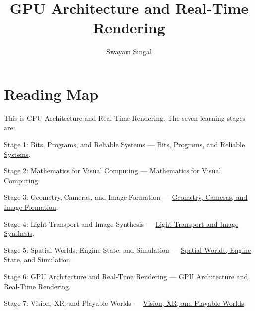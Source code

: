 \documentclass[11pt,twoside,openany]{book}
\title{GPU Architecture and Real-Time Rendering}
\author{Swayam Singal}
\begin{document}
\maketitle
\begin{center}\end{center}
\chapter*{Reading Map}
\hypertarget{volume-reading-map}{}
\noindent This is GPU Architecture and Real-Time Rendering. The seven learning stages are:
\par\noindent Stage 1: Bits, Programs, and Reliable Systems --- \href{../01-Bits-Programs-and-Reliable-Systems/main.pdf}{Bits, Programs, and Reliable Systems}.
\par\noindent Stage 2: Mathematics for Visual Computing --- \href{../02-Mathematics-for-Visual-Computing/main.pdf}{Mathematics for Visual Computing}.
\par\noindent Stage 3: Geometry, Cameras, and Image Formation --- \href{../03-Geometry-Cameras-and-Image-Formation/main.pdf}{Geometry, Cameras, and Image Formation}.
\par\noindent Stage 4: Light Transport and Image Synthesis --- \href{../04-Light-Transport-and-Image-Synthesis/main.pdf}{Light Transport and Image Synthesis}.
\par\noindent Stage 5: Spatial Worlds, Engine State, and Simulation --- \href{../05-Spatial-Worlds-Engine-State-and-Simulation/main.pdf}{Spatial Worlds, Engine State, and Simulation}.
\par\noindent Stage 6: GPU Architecture and Real-Time Rendering --- \href{../06-GPU-Architecture-and-Real-Time-Rendering/main.pdf}{GPU Architecture and Real-Time Rendering}.
\par\noindent Stage 7: Vision, XR, and Playable Worlds --- \href{../07-Vision-XR-and-Playable-Worlds/main.pdf}{Vision, XR, and Playable Worlds}.
\tableofcontents
\mainmatter
\setcounter{chapter}{0}





\end{document}
